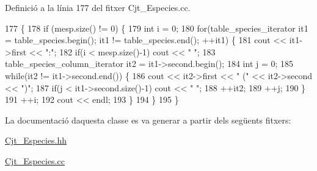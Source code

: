 Definició a la línia 177 del fitxer Cjt\+\_\+\+Especies.\+cc.


\begin{DoxyCode}
177                                        \{
178     \textcolor{keywordflow}{if} (mesp.size() != 0) \{
179         \textcolor{keywordtype}{int} i = 0;
180         \textcolor{keywordflow}{for}(table\_species\_iterator it1 = table\_species.begin(); it1 != table\_species.end(); ++it1) \{
181             cout << it1->first << \textcolor{stringliteral}{":"};
182             \textcolor{keywordflow}{if}(i < mesp.size()-1) cout << \textcolor{stringliteral}{" "};
183             table\_species\_column\_iterator it2 = it1->second.begin();
184             \textcolor{keywordtype}{int} j = 0;
185             \textcolor{keywordflow}{while}(it2 != it1->second.end()) \{
186                 cout << it2->first << \textcolor{stringliteral}{" ("} << it2->second << \textcolor{stringliteral}{")"};
187                 \textcolor{keywordflow}{if}(j < it1->second.size()-1) cout << \textcolor{stringliteral}{" "};
188                 ++it2;
189                 ++j;
190             \}
191             ++i;
192             cout << endl;
193         \}
194     \}
195 \}
\end{DoxyCode}


La documentació d\textquotesingle{}aquesta classe es va generar a partir dels següents fitxers\+:\begin{DoxyCompactItemize}
\item 
\hyperlink{_cjt___especies_8hh}{Cjt\+\_\+\+Especies.\+hh}\item 
\hyperlink{_cjt___especies_8cc}{Cjt\+\_\+\+Especies.\+cc}\end{DoxyCompactItemize}
